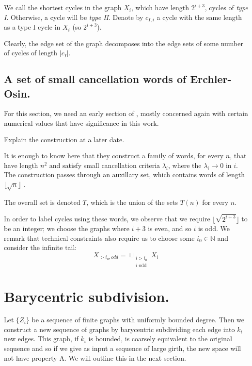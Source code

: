 \documentclass[11pt,a4paper]{amsart}
\theoremstyle{plain}
\theoremstyle{definition}%
\theoremstyle{remark}%
\begin{document}
We call the shortest cycles in the graph $X_{i}$, which have length $2^{i+3}$, cycles of \textit{type I}. Otherwise, a cycle will be \textit{type II}. Denote by $c_{I,i}$ a cycle with the same length as a type I cycle in $X_{i}$ (so  $2^{i+3}$). 

Clearly, the edge set of the graph decomposes into the edge sets of some number of cycles of length $\vert c_{I} \vert$. 

\subsection{A set of small cancellation words of Erchler-Osin.}

For this section, we need an early section of \cite{MR2136537}, mostly concerned again with certain numerical 
values that have significance in this work. 

Explain the construction at a later date.

It is enough to know here that they construct a family of words, for every $n$, that have length $n^{2}$ and satisfy small cancellation criteria $\lambda_{i}$, where the $\lambda_{i} \rightarrow 0$ in $i$. The construction passes through an auxillary set, which contains words of length $\lfloor \sqrt{n} \rfloor$ \cite{MR2136537}. 

The overall set is denoted $T$, which is the union of the sets $T(n)$ for every $n$. 

In order to label cycles using these words, we observe that we require  $\lfloor \sqrt{2^{i+3}} \rfloor$ to be an integer; we choose the graphs where $i+3$ is even, and so $i$ is odd. We remark that technical constraints also require us to choose some $i_{0} \in \mathbb{N}$ and consider the infinite tail: 
\begin{equation*}
X_{>i_{0},odd}= \sqcup_{\substack{i>i_{0}\\ i \mbox{ odd}}}X_{i}
\end{equation*}

\section{Barycentric subdivision.}

Let $\lbrace Z_{i} \rbrace$ be a sequence of finite graphs with uniformly bounded degree. Then we construct a new sequence of graphs by barycentric subdividing each edge into $k_{i}$ new edges. This graph, if $k_{i}$ is bounded, is coarsely equivalent to the original sequence and so if we give as input a sequence of large girth, the new space will not have property A. We will outline this in the next section.
\end{document}
